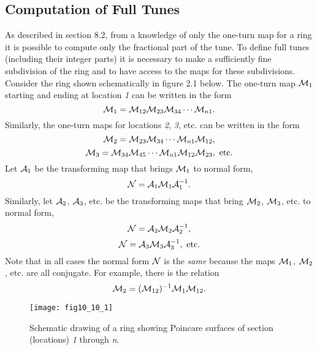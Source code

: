 \subsection{Computation of Full Tunes} 
\label{fulltunes}
As described in section 8.2, from a knowledge of only the one-turn map
for a ring it is
possible to compute only the fractional part of the tune.  To define full
tunes (including their integer parts) it is necessary to make a
sufficiently fine subdivision of the ring and to have access to the maps
for these subdivisions.  Consider the ring shown schematically in figure
2.1 below.  The one-turn map ${\cal M}_1$ starting and ending at
location {\em 1} can be written in the form
\begin{equation}
{\cal M}_1 = {\cal M}_{12} {\cal M}_{23} {\cal M}_{34} \cdots {\cal M}_{n1}.
\end{equation}
Similarly, the one-turn maps for locations {\em 2}, {\em 3}, etc. can be written in
the form
\begin{equation}
{\cal M}_2 = {\cal M}_{23} {\cal M}_{34} \cdots {\cal M}_{n1} {\cal M}_{12},
\end{equation}
\begin{equation}
{\cal M}_3 = {\cal M}_{34} {\cal M}_{45} \cdots {\cal M}_{n1} {\cal M}_{12} {\cal
M}_{23} , \ {\rm etc.}
\end{equation}
Let ${\cal A}_1$ be the transforming map that brings ${\cal M}_1$ to
normal form,
\begin{equation}
{\cal N} = {\cal A}_1 {\cal M}_1 {\cal A}^{-1}_1.
\end{equation}
Similarly, let ${\cal A}_2$, ${\cal A}_3$, etc. be the transforming maps
that bring ${\cal M}_2$, ${\cal M}_3$, etc. to normal form,
\begin{equation}
{\cal N} = {\cal A}_2 {\cal M}_2 {\cal A}_2^{-1},
\end{equation}
\begin{equation}
{\cal N} = {\cal A}_3 {\cal M}_3 {\cal A}_3^{-1}, \ {\rm etc}.
\end{equation}
Note that in all cases the normal form ${\cal N}$ is the {\em same}
because the maps ${\cal M}_1$, ${\cal M}_2$, etc. are all conjugate.  For
example, there is the relation
\begin{equation}
{\cal M}_2 = ({\cal M}_{12})^{-1} {\cal M}_1 {\cal M}_{12}.
\end{equation}

\begin{figure}[h]
\renewcommand{\thefigure}{\thesection.\arabic{figure}}
  \centering
  \texttt{[image: fig10\_10\_1]}
  \caption{Schematic drawing of a ring showing Poincare surfaces of
section (locations) {\em 1} through {\em n}.}
\end{figure}

